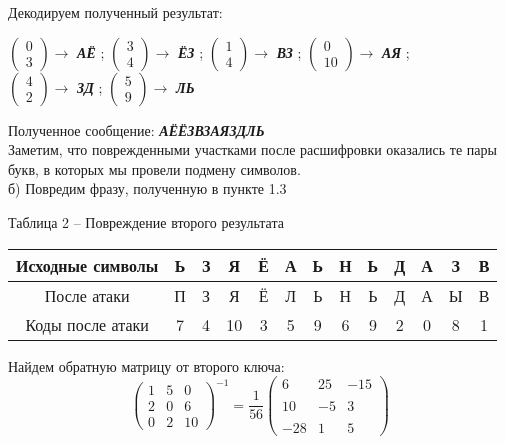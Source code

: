 \documentclass[a5paper, 10pt]{article}
\theoremstyle{definition}
\theoremstyle{plain}
\theoremstyle{remark}
\begin{document}
Декодируем полученный результат:
\begin{center}
 $ \begin{pmatrix}
0\\
3
\end{pmatrix} \to$ \textbf{\textit{АЁ}} ;
 $ \begin{pmatrix}
3\\
4
\end{pmatrix} \to$ \textbf{\textit{ЁЗ}} ;
 $ \begin{pmatrix}
1\\
4
\end{pmatrix} \to$ \textbf{\textit{ВЗ}} ;
 $ \begin{pmatrix}
0\\
10
\end{pmatrix} \to$ \textbf{\textit{АЯ}} ; \\
 $ \begin{pmatrix}
4\\
2
\end{pmatrix} \to$ \textbf{\textit{ЗД}} ;
$\begin{pmatrix}
5\\
9
\end{pmatrix} \to$ \textbf{\textit{ЛЬ}}  \\
\end{center}
Полученное сообщение:  \textbf{\textit{\colorbox{red! 50}{АЁ}\colorbox{green! 50}{ЁЗ}\colorbox{red! 50}{ВЗ}\colorbox{green! 50}{АЯ}\colorbox{red! 50}{ЗД}\colorbox{green! 50}{ЛЬ}}}\\
Заметим, что поврежденными участками после расшифровки оказались те пары букв, в которых мы провели подмену символов.\\

 б) Повредим фразу, полученную в пункте 1.3
\begin{center}
Таблица 2 -- Повреждение  второго результата\\
\begin{tabular}{ |c|c|c|c|c|c|c|c|c|c|c|c|c| } 
 \hline
Исходные символы & Ь & З & Я & Ё & А  & Ь & Н  & Ь & Д  & А & З  & В\\
\hline
После атаки & П & З & Я & Ё & Л  & Ь & Н  & Ь & Д  & А & Ы  & В \\
 \hline
Коды после атаки & 7 & 4 & 10 & 3 & 5  & 9 & 6  & 9 & 2  & 0 & 8  & 1  \\
 \hline
\end{tabular}
\end{center}
Найдем обратную матрицу от второго ключа:
\begin{equation}
\begin{pmatrix}
 1 & 5 & 0\\
 2 & 0 & 6 \\
 0 & 2 & 10
\end{pmatrix}^{-1}
 = 
 \frac{1}{56}\begin{pmatrix}
 6 & 25 & -15\\
\\
 10 & -5 & 3 \\
\\
 -28 & 1 & 5
\end{pmatrix}
\end{equation}
\end{document}
